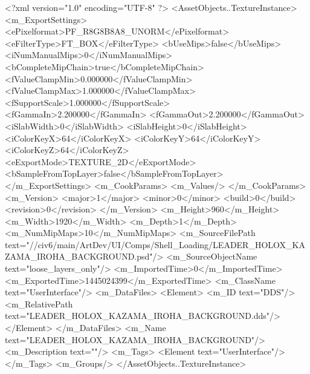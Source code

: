 <?xml version="1.0" encoding="UTF-8" ?>
<AssetObjects..TextureInstance>
	<m_ExportSettings>
		<ePixelformat>PF_R8G8B8A8_UNORM</ePixelformat>
		<eFilterType>FT_BOX</eFilterType>
		<bUseMips>false</bUseMips>
		<iNumManualMips>0</iNumManualMips>
		<bCompleteMipChain>true</bCompleteMipChain>
		<fValueClampMin>0.000000</fValueClampMin>
		<fValueClampMax>1.000000</fValueClampMax>
		<fSupportScale>1.000000</fSupportScale>
		<fGammaIn>2.200000</fGammaIn>
		<fGammaOut>2.200000</fGammaOut>
		<iSlabWidth>0</iSlabWidth>
		<iSlabHeight>0</iSlabHeight>
		<iColorKeyX>64</iColorKeyX>
		<iColorKeyY>64</iColorKeyY>
		<iColorKeyZ>64</iColorKeyZ>
		<eExportMode>TEXTURE_2D</eExportMode>
		<bSampleFromTopLayer>false</bSampleFromTopLayer>
	</m_ExportSettings>
	<m_CookParams>
		<m_Values/>
	</m_CookParams>
	<m_Version>
		<major>1</major>
		<minor>0</minor>
		<build>0</build>
		<revision>0</revision>
	</m_Version>
	<m_Height>960</m_Height>
	<m_Width>1920</m_Width>
	<m_Depth>1</m_Depth>
	<m_NumMipMaps>10</m_NumMipMaps>
	<m_SourceFilePath text="//civ6/main/ArtDev/UI/Comps/Shell_Loading/LEADER_HOLOX_KAZAMA_IROHA_BACKGROUND.psd"/>
	<m_SourceObjectName text="loose_layers_only"/>
	<m_ImportedTime>0</m_ImportedTime>
	<m_ExportedTime>1445024399</m_ExportedTime>
	<m_ClassName text="UserInterface"/>
	<m_DataFiles>
		<Element>
			<m_ID text="DDS"/>
			<m_RelativePath text="LEADER_HOLOX_KAZAMA_IROHA_BACKGROUND.dds"/>
		</Element>
	</m_DataFiles>
	<m_Name text="LEADER_HOLOX_KAZAMA_IROHA_BACKGROUND"/>
	<m_Description text=""/>
	<m_Tags>
		<Element text="UserInterface"/>
	</m_Tags>
	<m_Groups/>
</AssetObjects..TextureInstance>

